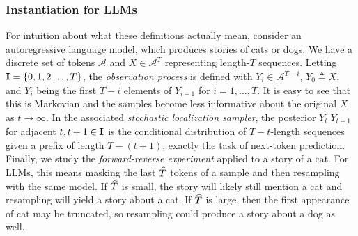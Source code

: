 \subsubsection{Instantiation for LLMs}
For intuition about what these definitions actually mean, consider an autoregressive language model, which produces stories of cats or dogs. We have a discrete set of tokens $\mathcal{A}$ and $X \in \mathcal{A}^T$ representing length-$T$ sequences. Letting $\mathbf{I}=\{0,1,2\dots,T\}$, the \emph{observation process} is defined with $Y_i \in \mathcal{A}^{T-i}$, $Y_0 \triangleq X$, and $Y_i$ being the  first $T-i$ elements of $Y_{i-1}$ for $i =1,\dots,T$. It is easy to see that this is Markovian and the samples become less informative about the original $X$ as $t \to \infty$. In the associated \emph{stochastic localization sampler}, the posterior $Y_t|Y_{t+1}$ for adjacent $t,t+1 \in \mathbf{I}$ is the conditional distribution of $T-t$-length sequences given a prefix of length $T-(t+1)$, exactly the task of next-token prediction.  
Finally, we study the \emph{forward-reverse experiment} applied to a story of a cat. For LLMs, this means masking the last $\widehat{T}$ tokens of a sample and then resampling with the same model. If $\widehat{T}$ is small, the story will likely still mention a cat and resampling will yield a story about a cat. If $\widehat{T}$ is large, then the first appearance of cat may be truncated, so resampling could produce a story about a dog as well.


